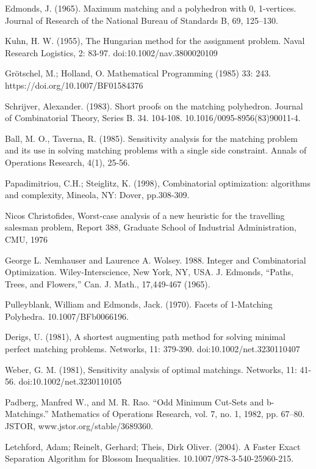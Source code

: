 \documentclass[twoside,a4paper,openright,12pt]{book}
\begin{document}
\begin{thebibliography}{9}
Edmonds, J. (1965). Maximum matching and a polyhedron with 0, 1-vertices. Journal of Research of the National Bureau of Standards B, 69, 125--130. 

Kuhn, H. W. (1955), The Hungarian method for the assignment problem. Naval Research Logistics, 2: 83-97. doi:10.1002/nav.3800020109
  
Grötschel, M.; Holland, O. Mathematical Programming (1985) 33: 243. https://doi.org/10.1007/BF01584376

Schrijver, Alexander. (1983). Short proofs on the matching polyhedron. Journal of Combinatorial Theory, Series B. 34. 104-108. 10.1016/0095-8956(83)90011-4. 
 
Ball, M. O.,  Taverna, R. (1985). Sensitivity analysis for the matching problem and its use in solving matching problems with a single side constraint. Annals of Operations Research, 4(1), 25-56.

Papadimitriou, C.H.; Steiglitz, K. (1998), Combinatorial optimization: algorithms and complexity, Mineola, NY: Dover, pp.308-309.

Nicos Christofides, Worst-case analysis of a new heuristic for the travelling salesman problem, Report 388, Graduate School of Industrial Administration, CMU, 1976

George L. Nemhauser and Laurence A. Wolsey. 1988. Integer and Combinatorial Optimization. Wiley-Interscience, New York, NY, USA.
J. Edmonds, “Paths, Trees, and Flowers,” Can. J. Math., 17,449-467 (1965).

Pulleyblank, William and Edmonds, Jack. (1970). Facets of 1-Matching Polyhedra. 10.1007/BFb0066196. 

Derigs, U. (1981), A shortest augmenting path method for solving minimal perfect matching problems. Networks, 11: 379-390. doi:10.1002/net.3230110407

Weber, G. M. (1981), Sensitivity analysis of optimal matchings. Networks, 11: 41-56. doi:10.1002/net.3230110105

Padberg, Manfred W., and M. R. Rao. “Odd Minimum Cut-Sets and b-Matchings.” Mathematics of Operations Research, vol. 7, no. 1, 1982, pp. 67–80. JSTOR, www.jstor.org/stable/3689360.

Letchford, Adam;  Reinelt, Gerhard; Theis, Dirk Oliver. (2004). A Faster Exact Separation Algorithm for Blossom Inequalities. 10.1007/978-3-540-25960-215. 


\end{thebibliography}
\end{document}
